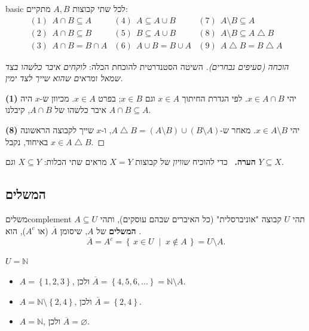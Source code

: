 \documentclass[11pt,a4paper]{report}
\newenvironment{remark}{\par\smallskip\noindent\textsf{\textbf{הערה.}}\ }{\par\smallskip}
\newcommand{\N}{\mathbb{N}}
\newcommand{\set}[1]{\left\{#1\right\}}
\newcommand{\setof}[2]{\left\{\,#1 \;\middle|\; #2\,\right\}}
\newcommand{\symdiff}{\mathbin{\triangle}}
\newcommand{\comp}[1]{\overline{#1}}
\renewcommand{\emptyset}{\varnothing}
\begin{document}
\begin{claim}{}{basic}
לכל שתי קבוצות $A,B$ מתקיים:
\[
\renewcommand{\arraystretch}{1.3}
\begin{array}{lll}
  (1)\ \ A\cap B\subseteq A & (4)\ \ A\subseteq A\cup B & (7)\ \ A\setminus B\subseteq A\\
  (2)\ \ A\cap B\subseteq B & (5)\ \ B\subseteq A\cup B & (8)\ \ A\setminus B\subseteq A\symdiff B\\
  (3)\ \ A\cap B= B\cap A & (6)\ \ A\cup B= B\cup A & (9)\ \ A\symdiff B= B\symdiff A
\end{array}
\]
\end{claim}

\begin{proof}[הוכחה (סעיפים נבחרים)]
השיטה הסטנדרטית להוכחת הכלה: \emph{לוקחים איבר כלשהו בצד שמאל ומראים שהוא שייך לצד ימין.}

\textbf{(1)} יהי $x\in A\cap B$. לפי הגדרת החיתוך $x\in A$ וגם $x\in B$; בפרט $x\in A$. מכיוון ש-$x$ היה איבר כלשהו של $A\cap B$, קיבלנו $A\cap B\subseteq A$.

\textbf{(8)} יהי $x\in A\setminus B$. מאחר ש-$A\symdiff B=(A\setminus B)\cup(B\setminus A)$, ו-$x$ שייך לקבוצה הראשונה באיחוד, נקבל $x\in A\symdiff B$.
\end{proof}

\begin{remark}
כדי להוכיח \emph{שוויון} של קבוצות $X=Y$ מראים שתי הכלות: $X\subseteq Y$ וגם $Y\subseteq X$.
\end{remark}

\subsection{המשלים}

\begin{definition}{משלים}{complement}
תהי $U$ קבוצה "אוניברסלית" (כל האיברים שבהם עוסקים), ותהי $A\subseteq U$. \textbf{המשלים} של $A$, שיסומן $\comp{A}$ (או $A^c$), הוא
\[
  \comp{A}=A^c=\setof{x\in U}{x\notin A}=U\setminus A.
\]
\end{definition}

\begin{example}{$U=\N$}{}
\begin{itemize}
  \item $A=\set{1,2,3}$, ולכן $\comp{A}=\set{4,5,6,\dots}=\N\setminus A$.
  \item $A=\N\setminus\set{2,4}$, ולכן $\comp{A}=\set{2,4}$.
  \item $A=\N$, ולכן $\comp{A}=\emptyset$.
\end{itemize}
\end{example}
\end{document}
